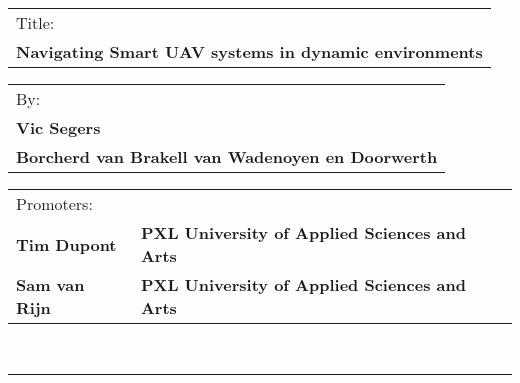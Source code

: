 \begin{tabular}{l}
  Title:\\
  \textbf{Navigating Smart UAV systems in dynamic environments}\\
\end{tabular}

\begin{tabular}{l}
  By:\\
  \textbf{Vic Segers}\\
  \textbf{Borcherd van Brakell van Wadenoyen en Doorwerth}\\
\end{tabular}

\begin{tabular}{l l}
  Promoters:\\
  \textbf{Tim Dupont} & \textbf{PXL University of Applied Sciences and Arts}\\
  \textbf{Sam van Rijn} & \textbf{PXL University of Applied Sciences and Arts}\\
\end{tabular}\\
\rule{\textwidth}{1pt}